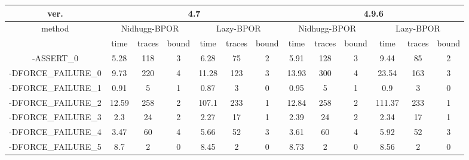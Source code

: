 \begin{tabular}{|c|c|c|c|c|c|c|c|c|c|c|c|c|}
\hline
ver. &  \multicolumn{6}{c|}{4.7} & \multicolumn{6}{c|}{4.9.6} \\
\hline
method  & \multicolumn{3}{c|}{Nidhugg-BPOR} & \multicolumn{3}{c|}{Lazy-BPOR} & \multicolumn{3}{c|}{Nidhugg-BPOR} & \multicolumn{3}{c|}{Lazy-BPOR} \\
\hline
{} &            time & traces & bound &      time & traces & bound &         time & traces & bound &      time & traces & bound \\
\hline
-ASSERT\_0         &          5.28 &    118 &     3 &      6.28 &     75 &     2 &         5.91 &    128 &     3 &      9.44 &     85 &     2 \\
\hline
-DFORCE\_FAILURE\_0 &         9.73 &    220 &     4 &     11.28 &    123 &     3 &        13.93 &    300 &     4 &     23.54 &    163 &     3 \\
\hline
-DFORCE\_FAILURE\_1 &         0.91 &      5 &     1 &      0.87 &      3 &     0 &         0.95 &      5 &     1 &       0.9 &      3 &     0 \\
\hline
-DFORCE\_FAILURE\_2 &        12.59 &    258 &     2 &     107.1 &    233 &     1 &        12.84 &    258 &     2 &    111.37 &    233 &     1 \\
\hline
-DFORCE\_FAILURE\_3 &          2.3 &     24 &     2 &      2.27 &     17 &     1 &         2.39 &     24 &     2 &      2.34 &     17 &     1 \\
\hline
-DFORCE\_FAILURE\_4 &         3.47 &     60 &     4 &      5.66 &     52 &     3 &         3.61 &     60 &     4 &      5.92 &     52 &     3 \\
\hline
-DFORCE\_FAILURE\_5 &          8.7 &      2 &     0 &      8.45 &      2 &     0 &         8.73 &      2 &     0 &      8.56 &      2 &     0 \\
\hline
\end{tabular}

